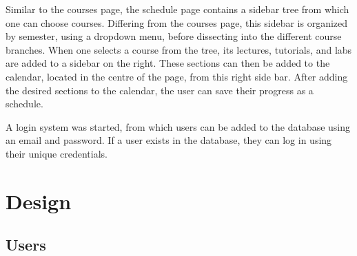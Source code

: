 \documentclass[twoside=false,a4paper,11pt]{article}
\theoremstyle{mytheor}
\begin{document}
Similar to the courses page, the schedule page contains a sidebar tree from which one can choose courses. Differing from the courses page, this sidebar is organized by semester, using a dropdown menu, before dissecting into the different course branches. When one selects a course from the tree, its lectures, tutorials, and labs are added to a sidebar on the right. These sections can then be added to the calendar, located in the centre of the page, from this right side bar. After adding the desired sections to the calendar, the user can save their progress as a schedule.

A login system was started, from which users can be added to the database using an email and password. If a user exists in the database, they can log in using their unique credentials.

\section*{Design}

\subsection*{Users}
\end{document}
